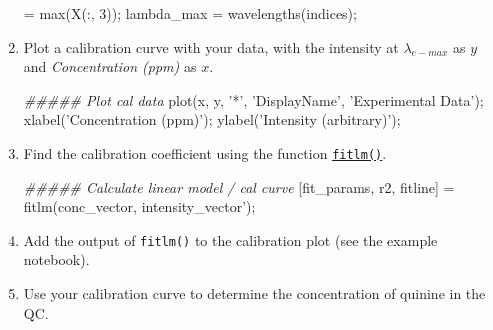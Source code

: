 \documentclass[]{tufte-book}
\newenvironment{Shaded}{}{}
\newcommand{\CommentTok}[1]{\textcolor[rgb]{0.38,0.63,0.69}{\textit{#1}}}
\newcommand{\FloatTok}[1]{\textcolor[rgb]{0.25,0.63,0.44}{#1}}
\newcommand{\FunctionTok}[1]{\textcolor[rgb]{0.02,0.16,0.49}{#1}}
\newcommand{\NormalTok}[1]{#1}
\newcommand{\OperatorTok}[1]{\textcolor[rgb]{0.40,0.40,0.40}{#1}}
\newcommand{\StringTok}[1]{\textcolor[rgb]{0.25,0.44,0.63}{#1}}
\begin{document}
\begin{enumerate}
\begin{Shaded}
\begin{Highlighting}[]
\NormalTok{[max_values indices] }\OperatorTok{=} \FunctionTok{max}\NormalTok{(X(}\OperatorTok{:,} \FloatTok{3}\NormalTok{))}\OperatorTok{;}
\NormalTok{lambda_max }\OperatorTok{=}\NormalTok{ wavelengths(indices)}\OperatorTok{;}
\end{Highlighting}
\end{Shaded}
\item
  Plot a calibration curve with your data, with the intensity at \(\lambda_{e-max}\) as \(y\) and \emph{Concentration (ppm)} as \(x\).

\begin{Shaded}
\begin{Highlighting}[]
\CommentTok{##### Plot cal data}
\FunctionTok{plot}\NormalTok{(x}\OperatorTok{,}\NormalTok{ y}\OperatorTok{,} \StringTok{'*'}\OperatorTok{,} \StringTok{'DisplayName'}\OperatorTok{,} \StringTok{'Experimental Data'}\NormalTok{)}\OperatorTok{;}
\FunctionTok{xlabel}\NormalTok{(}\StringTok{'Concentration (ppm)'}\NormalTok{)}\OperatorTok{;}
\FunctionTok{ylabel}\NormalTok{(}\StringTok{'Intensity (arbitrary)'}\NormalTok{)}\OperatorTok{;}
\end{Highlighting}
\end{Shaded}
\item
  Find the calibration coefficient using the function \href{fit-linear-model-calibration.html}{\texttt{fitlm()}}.

\begin{Shaded}
\begin{Highlighting}[]
\CommentTok{##### Calculate linear model / cal curve}
\NormalTok{[fit_params}\OperatorTok{,}\NormalTok{ r2}\OperatorTok{,}\NormalTok{ fitline] }\OperatorTok{=}\NormalTok{ fitlm(conc_vector}\OperatorTok{,}\NormalTok{ intensity_vector}\OperatorTok{'}\NormalTok{)}\OperatorTok{;}
\end{Highlighting}
\end{Shaded}
\item
  Add the output of \texttt{fitlm()} to the calibration plot (see the example notebook).

\begin{Shaded}
\end{Shaded}
\item
  Use your calibration curve to determine the concentration of quinine in the QC.


\end{enumerate}
\end{document}
